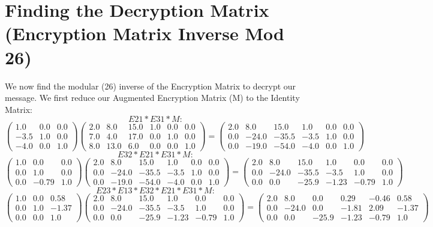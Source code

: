 \documentclass{article}%
\begin{document}
\section{Finding the Decryption Matrix (Encryption Matrix Inverse Mod 26)}%
\label{sec:FindingtheDecryptionMatrix(EncryptionMatrixInverseMod26)}%
We now find the modular (26) inverse of the Encryption Matrix to decrypt our message. \newline%
 \newline%
%
We first reduce our Augmented Encryption Matrix (M) to the Identity Matrix: \newline%
 \newline%
%
\[%
E21 * E31 * M:%
\]%
\[%
\begin{pmatrix}%
1.0&0.0&0.0\\%
-3.5&1.0&0.0\\%
-4.0&0.0&1.0%
\end{pmatrix} \begin{pmatrix}%
2.0&8.0&15.0&1.0&0.0&0.0\\%
7.0&4.0&17.0&0.0&1.0&0.0\\%
8.0&13.0&6.0&0.0&0.0&1.0%
\end{pmatrix} = \begin{pmatrix}%
2.0&8.0&15.0&1.0&0.0&0.0\\%
0.0&-24.0&-35.5&-3.5&1.0&0.0\\%
0.0&-19.0&-54.0&-4.0&0.0&1.0%
\end{pmatrix}%
\]%
\newline%
%
\[%
E32 * E21 * E31 * M:%
\]%
\[%
\begin{pmatrix}%
1.0&0.0&0.0\\%
0.0&1.0&0.0\\%
0.0&-0.79&1.0%
\end{pmatrix} \begin{pmatrix}%
2.0&8.0&15.0&1.0&0.0&0.0\\%
0.0&-24.0&-35.5&-3.5&1.0&0.0\\%
0.0&-19.0&-54.0&-4.0&0.0&1.0%
\end{pmatrix} = \begin{pmatrix}%
2.0&8.0&15.0&1.0&0.0&0.0\\%
0.0&-24.0&-35.5&-3.5&1.0&0.0\\%
0.0&0.0&-25.9&-1.23&-0.79&1.0%
\end{pmatrix}%
\]%
\newline%
%
\[%
E23 * E13 * E32 * E21 * E31 * M:%
\]%
\[%
\begin{pmatrix}%
1.0&0.0&0.58\\%
0.0&1.0&-1.37\\%
0.0&0.0&1.0%
\end{pmatrix} \begin{pmatrix}%
2.0&8.0&15.0&1.0&0.0&0.0\\%
0.0&-24.0&-35.5&-3.5&1.0&0.0\\%
0.0&0.0&-25.9&-1.23&-0.79&1.0%
\end{pmatrix} = \begin{pmatrix}%
2.0&8.0&0.0&0.29&-0.46&0.58\\%
0.0&-24.0&0.0&-1.81&2.09&-1.37\\%
0.0&0.0&-25.9&-1.23&-0.79&1.0%
\end{pmatrix}%
\]%
\end{document}
